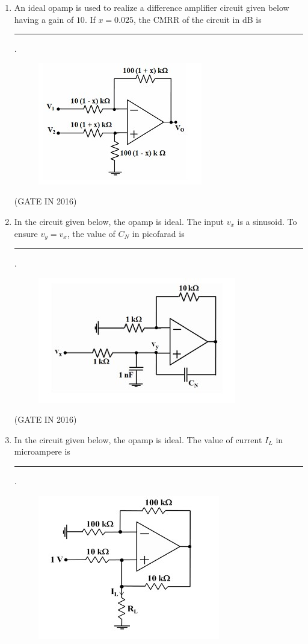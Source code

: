 \documentclass[journal,12pt,onecolumn]{IEEEtran}
\theoremstyle{remark}
\begin{document}
\begin{enumerate}
\item An ideal opamp is used to realize a difference amplifier circuit given below having a gain of $10$. If $x = 0.025$, the CMRR of the circuit in dB is \rule{2cm}{0.4pt}.
\begin{figure}[H]
\centering
\includegraphics[width=0.5\columnwidth]{figs/z20.jpg}
\caption*{}
\label{fig:z20}
\end{figure}

\hfill{(GATE IN 2016)}

\item In the circuit given below, the opamp is ideal. The input $v_x$ is a sinusoid. To ensure $v_y = v_x$, the value of $C_N$ in picofarad is \rule{2cm}{0.4pt}.
\begin{figure}[H]
\centering
\includegraphics[width=0.5\columnwidth]{figs/z21.jpg}
\caption*{}
\label{fig:z21}
\end{figure}

\hfill{(GATE IN 2016)}

\item In the circuit given below, the opamp is ideal. The value of current $I_L$ in microampere is \rule{2cm}{0.4pt}.
\begin{figure}[H]
\centering
\includegraphics[width=0.5\columnwidth]{figs/z22.jpg}
\caption*{}
\label{fig:z22}
\end{figure}


\end{enumerate}
\end{document}
